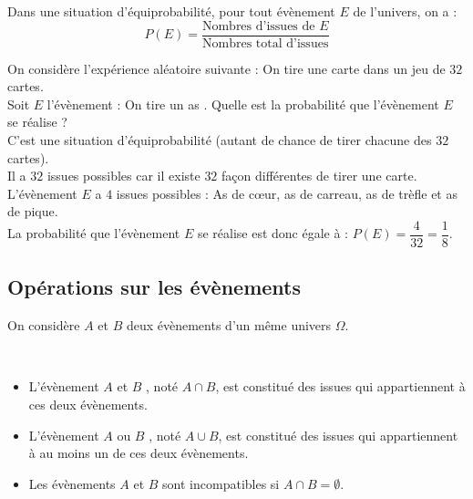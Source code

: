 \begin{Propriété}
Dans une situation d'équiprobabilité, pour tout évènement $E$ de l'univers, on a : 
$$P(E)=\dfrac{\text{Nombres d'issues de }E}{\text{Nombres total d'issues}}$$
\end{Propriété}
\vspace{0.3cm}

\begin{Exemple}
On considère l'expérience aléatoire suivante : 
On tire une carte dans un jeu de $32$ cartes.\\
Soit $E$ l'évènement : \og On tire un as \fg{}.
Quelle est la probabilité que l'évènement $E$ se réalise ? \\

C'est une situation d'équiprobabilité (autant de chance de tirer chacune des $32$ cartes).\\
Il a $32$ issues possibles car il existe $32$ façon différentes de tirer une carte. \\L'évènement $E$ a $4$ issues possibles : As de c{\oe}ur, as de carreau, as de trèfle et as de pique.\\
La probabilité que l'évènement $E$ se réalise est donc égale à : $P(E) = \dfrac{4}{32}=\dfrac{1}{8}$.
\end{Exemple}
\newpage

\subsection{Opérations sur les évènements}
\noindent On considère $A$ et $B$ deux évènements d'un même univers $\Omega$.
\begin{Définition} $ $\\
\begin{itemize}[label=\textcolor{Couleur6}{$\bullet$}]
\item L'évènement \og $A$ et $B$ \fg{}, noté $A\cap B$, est constitué des issues qui appartiennent à ces deux évènements.
\item  L'évènement \og $A$ ou $B$ \fg{}, noté $A\cup B$, est constitué des issues qui appartiennent à au moins un de ces deux évènements.
\item Les évènements $A$ et $B$ sont incompatibles si $A\cap B=\emptyset$.
\end{itemize}

\end{Définition}

